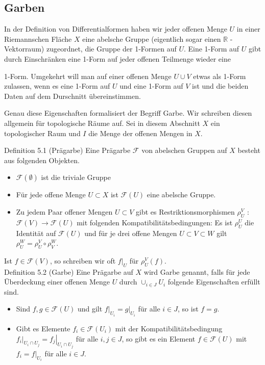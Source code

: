\documentclass[10pt, letterpaper]{article}
\begin{document}
\subsection {Garben}
In der Definition von Differentialformen haben wir jeder offenen Menge $U$ in einer Riemannschen Fläche $X$ eine abelsche Gruppe (eigentlich sogar einen $\mathbb{R}$ -Vektorraum) zugeordnet, die Gruppe der 1-Formen auf $U$. Eine 1-Form auf $U$ gibt durch Einschränken eine 1-Form auf jeder offenen Teilmenge wieder eine

1-Form. Umgekehrt will man auf einer offenen Menge $U \cup V$ etwas als 1-Form zulassen, wenn es eine 1-Form auf $U$ und eine 1-Form auf $V$ ist und die beiden Daten auf dem Durschnitt übereinstimmen.

Genau diese Eigenschaften formalisiert der Begriff Garbe. Wir schreiben diesen allgemein für topologische Räume auf. Sei in diesem Abschnitt $X$ ein topologischer Raum und $I$ die Menge der offenen Mengen in $X$.

Definition 5.1 (Prägarbe) Eine Prägarbe $\mathcal{F}$ von abelschen Gruppen auf $X$ besteht aus folgenden Objekten.

\begin{itemize}
  \item $\mathcal{F}(\emptyset)$ ist die triviale Gruppe
  \item Für jede offene Menge $U \subset X$ ist $\mathcal{F}(U)$ eine abelsche Gruppe.
  \item Zu jedem Paar offener Mengen $U \subset V$ gibt es Restriktionsmorphismen $\rho_{U}^{V}$ : $\mathcal{F}(V) \rightarrow \mathcal{F}(U)$ mit folgenden Kompatibilitätsbedingungen: Es ist $\rho_{U}^{U}$ die Identität auf $\mathcal{F}(U)$ und für je drei offene Mengen $U \subset V \subset W$ gilt $\rho_{U}^{W}=\rho_{U}^{V} \circ \rho_{V}^{W}$.
\end{itemize}

Ist $f \in \mathcal{F}(V)$, so schreiben wir oft $\left.f\right|_{U}$ für $\rho_{U}^{V}(f)$.\\
Definition 5.2 (Garbe) Eine Prägarbe auf $X$ wird Garbe genannt, falls für jede Überdeckung einer offenen Menge $U$ durch $\cup_{i \in J} U_{i}$ folgende Eigenschaften erfüllt sind.

\begin{itemize}
  \item Sind $f, g \in \mathcal{F}(U)$ und gilt $\left.f\right|_{U_{i}}=\left.g\right|_{U_{i}}$ für alle $i \in J$, so ist $f=g$.
  \item Gibt es Elemente $f_{i} \in \mathcal{F}\left(U_{i}\right)$ mit der Kompatibilitätsbedingung $\left.f_{i}\right|_{U_{i} \cap U_{j}}= \left.f_{j}\right|_{U_{i} \cap U_{j}}$ für alle $i, j \in J$, so gibt es ein Element $f \in \mathcal{F}(U)$ mit $f_{i}=\left.f\right|_{U_{i}}$ für alle $i \in J$.
\end{itemize}
\end{document}
